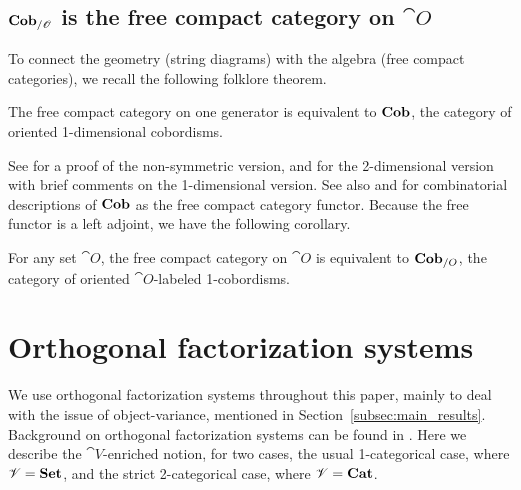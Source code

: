 \documentclass[12pt,oneside,article,draft]{memoir}
\begin{document}
\subsection{$\mathbf{Cob}_{/\mathscr{O}}$ is the free compact category on $\cat{O}$}

To connect the geometry (string diagrams) with the algebra (free compact categories), we recall the following folklore theorem. 

\begin{theorem}
The free compact category on one generator is equivalent to $\mathbf{Cob}$, the category of oriented 1-dimensional cobordisms.
\end{theorem}

See \cite[Theorem 3.6]{FreydYetter} for a proof of the non-symmetric version, \cite{Kock} and \cite{BaezDolan} for the 2-dimensional version with brief comments on the 1-dimensional version. See also \cite{KellyLaplaza} and \cite{Abramsky2} for combinatorial descriptions of $\mathbf{Cob}$ as the free compact category functor.  Because the free functor is a left adjoint, we have the following corollary.

\begin{corollary}\label{cor:free_compact_is_Cob}

For any set $\cat{O}$, the free compact category on $\cat{O}$ is equivalent to $\mathbf{Cob}_{/O}$, the category of oriented $\cat{O}$-labeled 1-cobordisms. 

\end{corollary}


\section{Orthogonal factorization systems}

We use orthogonal factorization systems throughout this paper, mainly to deal with the issue of object-variance, mentioned in Section~\ref{subsec:main_results}. Background on orthogonal factorization systems can be found in \cite[Chapter 5.5]{BorceuxV1}. Here we describe the $\cat{V}$-enriched notion, for two cases, the usual 1-categorical case, where $\mathscr{V}=\mathbf{Set}$, and the strict 2-categorical case, where $\mathscr{V}=\mathbf{Cat}$.
\end{document}
